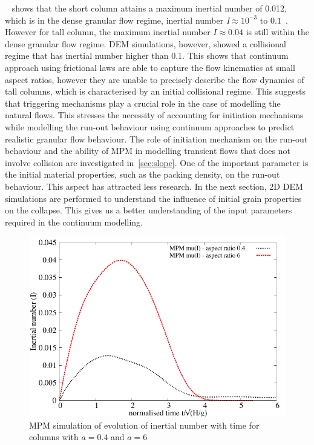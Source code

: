 ~ shows that the short column attains a maximum inertial 
number of 0.012, which is in the dense granular flow regime, inertial number 
\textit{I}$\approx10^{-3}$ to $0.1$~\citep{DaCruz2005}. However for tall 
column, the maximum inertial number $I\approx0.04$ is still within the 
dense granular flow regime. DEM simulations, however, showed a collisional 
regime that has inertial number higher than 0.1. This shows that continuum 
approach using frictional laws are able to capture the flow kinematics at small 
aspect ratios, however they are unable to precisely describe the flow dynamics 
of tall columns, which is characterised by an initial collisional regime. This 
suggests that triggering mechanisms play a crucial role in the case of 
modelling the natural flows. This stresses the necessity of accounting for 
initiation mechanisms while modelling the run-out behaviour 
using continuum approaches to predict realistic granular flow behaviour. The 
role of initiation mechanism on the run-out behaviour and the ability of MPM in 
modelling transient flows that does not involve collision are investigated 
in~\cref{sec:slope}. One of the important parameter is the initial material 
properties, such as the packing density, on the run-out behaviour. This aspect 
has attracted less research. In the next section, 2D DEM simulations are 
performed to understand the influence of initial grain properties on the 
collapse. This gives us a better understanding of the input parameters required 
in the continuum modelling. 

\begin{figure}[tbhp]
\centering
\includegraphics[width=\textwidth]{muI}
\caption{MPM simulation of evolution of inertial number with time for columns 
with $a=0.4$ and 
$a=6$}
\label{fig:muI}
\end{figure}

